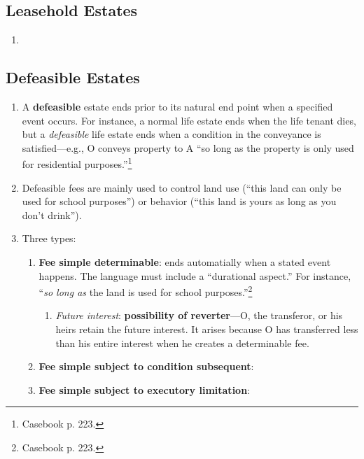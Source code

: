 \subsection{Leasehold Estates}

\begin{enumerate}
    \item %
\end{enumerate}

\subsection{Defeasible Estates}

\begin{enumerate}
    \item A \textbf{defeasible} estate ends prior to its natural end point 
    when a specified event occurs. For instance, a normal life estate ends 
    when the life tenant dies, but a \emph{defeasible} life estate ends when a 
    condition in the conveyance is satisfied---e.g., O conveys property to A 
    ``so long as the property is only used for residential 
    purposes.''\footnote{Casebook p. 223.}
    \item Defeasible fees are mainly used to control land use (``this land can 
    only be used for school purposes'') or behavior (``this land is yours as 
    long as you don't drink'').
    \item Three types:
    \begin{enumerate}
        \item \textbf{Fee simple determinable}: ends automatially when a 
        stated event happens. The language must include a ``durational 
        aspect.'' For instance, ``\emph{so long as} the land is used for 
        school purposes.''\footnote{Casebook p. 223.}
        \begin{enumerate}
            \item \emph{Future interest}: \textbf{possibility of 
            reverter}---O, the transferor, or his heirs retain the future 
            interest. It arises because O has transferred less than his entire 
            interest when he creates a determinable fee.
        \end{enumerate}
        \item \textbf{Fee simple subject to condition subsequent}: %
        \item \textbf{Fee simple subject to executory limitation}: 
    \end{enumerate}
\end{enumerate}

